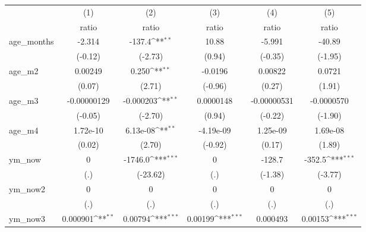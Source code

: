 {
\def\sym#1{\ifmmode^{#1}\else\(^{#1}\)\fi}
\begin{tabular}{l*{5}{c}}
\hline\hline
                    &\multicolumn{1}{c}{(1)}&\multicolumn{1}{c}{(2)}&\multicolumn{1}{c}{(3)}&\multicolumn{1}{c}{(4)}&\multicolumn{1}{c}{(5)}\\
                    &\multicolumn{1}{c}{ratio}&\multicolumn{1}{c}{ratio}&\multicolumn{1}{c}{ratio}&\multicolumn{1}{c}{ratio}&\multicolumn{1}{c}{ratio}\\
\hline
age\_months          &      -2.314         &      -137.4\sym{**} &       10.88         &      -5.991         &      -40.89         \\
                    &     (-0.12)         &     (-2.73)         &      (0.94)         &     (-0.35)         &     (-1.95)         \\
age\_m2              &     0.00249         &       0.250\sym{**} &     -0.0196         &     0.00822         &      0.0721         \\
                    &      (0.07)         &      (2.71)         &     (-0.96)         &      (0.27)         &      (1.91)         \\
age\_m3              & -0.00000129         &   -0.000203\sym{**} &   0.0000148         & -0.00000531         &  -0.0000570         \\
                    &     (-0.05)         &     (-2.70)         &      (0.94)         &     (-0.22)         &     (-1.90)         \\
age\_m4              &    1.72e-10         &    6.13e-08\sym{**} &   -4.19e-09         &    1.25e-09         &    1.69e-08         \\
                    &      (0.02)         &      (2.70)         &     (-0.92)         &      (0.17)         &      (1.89)         \\
ym\_now              &           0         &     -1746.0\sym{***}&           0         &      -128.7         &      -352.5\sym{***}\\
                    &         (.)         &    (-23.62)         &         (.)         &     (-1.38)         &     (-3.77)         \\
ym\_now2             &           0         &           0         &           0         &           0         &           0         \\
                    &         (.)         &         (.)         &         (.)         &         (.)         &         (.)         \\
ym\_now3             &    0.000901\sym{**} &     0.00794\sym{***}&     0.00199\sym{***}&    0.000493         &     0.00153\sym{***}\\

\end{tabular}}
